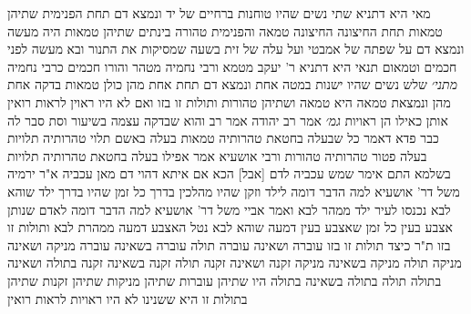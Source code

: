 \documentclass[12pt, openany]{book}
\begin{document}
{מאי היא  דתניא  שתי נשים שהיו טוחנות ברחיים של יד ונמצא דם תחת הפנימית שתיהן טמאות תחת החיצונה החיצונה טמאה והפנימית טהורה בינתים שתיהן טמאות 
היה מעשה ונמצא דם על שפתה של אמבטי ועל עלה של זית בשעה שמסיקות את התנור ובא מעשה לפני חכמים וטמאום 
תנאי היא דתניא  ר' יעקב מטמא ורבי נחמיה מטהר והורו חכמים כרבי נחמיה
{\large\emph{מתני׳}} שלש נשים שהיו ישנות במטה אחת ונמצא דם תחת אחת מהן כולן טמאות בדקה אחת מהן ונמצאת טמאה היא טמאה ושתיהן טהורות  ותולות זו בזו ואם לא היו ראוין לראות רואין אותן כאילו הן ראויות
{\large\emph{גמ׳}} אמר רב יהודה אמר רב והוא שבדקה עצמה בשיעור וסת 
סבר לה כבר פדא דאמר  כל שבעלה בחטאת טהרותיה טמאות
בעלה באשם תלוי טהרותיה תלויות בעלה פטור טהרותיה טהורות 
ורבי אושעיא אמר  אפילו בעלה בחטאת טהרותיה תלויות 
בשלמא התם אימר שמש עכביה לדם [אבל] הכא אם איתא דהוי דם מאן עכביה 
א"ר ירמיה  משל דר' אושעיא למה הדבר דומה לילד וזקן שהיו מהלכין בדרך כל זמן שהיו בדרך ילד שוהא לבא נכנסו לעיר ילד ממהר לבא  ואמר אביי  משל דר' אושעיא למה הדבר דומה לאדם שנותן אצבע בעין כל זמן שאצבע בעין דמעה שוהא לבא נטל האצבע דמעה ממהרת לבא
ותולות זו בזו ת"ר  כיצד תולות זו בזו  עוברה ושאינה עוברה תולה עוברה בשאינה עוברה
מניקה ושאינה מניקה תולה מניקה בשאינה מניקה זקנה ושאינה זקנה תולה זקנה בשאינה זקנה בתולה ושאינה בתולה תולה בתולה בשאינה בתולה 
היו שתיהן עוברות שתיהן מניקות שתיהן זקנות שתיהן בתולות זו היא ששנינו לא היו ראויות לראות רואין}
\end{document}
